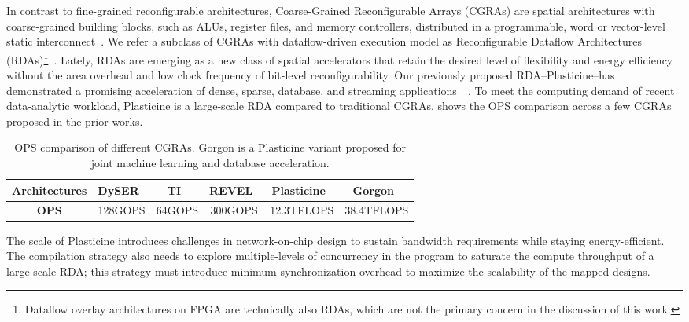 In contrast to fine-grained reconfigurable architectures,
Coarse-Grained Reconfigurable Arrays (CGRAs) are spatial architectures with 
coarse-grained building blocks, such as ALUs, register files, and memory controllers, 
distributed in a programmable, word or vector-level static interconnect~\cite{adres, kress, dyser, piperench, tartan, 
hrl, hycube}.
We refer a subclass of CGRAs with dataflow-driven execution model as Reconfigurable Dataflow
Architectures (RDAs)\footnote{Dataflow overlay architectures on FPGA are technically also RDAs, which are not the primary concern in the discussion of this work.}~\cite{plasticine, ti, streamdataflow,neuflow,cnndataflow,dataflowarch}.
Lately, RDAs are emerging as a new class of spatial accelerators that retain the desired level of
flexibility and energy efficiency without the area overhead and low clock frequency of bit-level reconfigurability.
Our previously proposed RDA--Plasticine--has demonstrated a promising acceleration of dense, sparse, database, and streaming applications~~\cite{plasticine, gorgon, multijoin,prabhakarthesis}.
To meet the computing demand of recent data-analytic workload, Plasticine is a large-scale RDA
compared to traditional CGRAs. 
 shows the OPS comparison across a few CGRAs proposed in the prior works.

\begin{table}
  \centering
\begin{tabular*}{0.88\textwidth}{cccccc}
  \toprule
  \textbf{Architectures} & DySER~\cite{dyser} & TI~\cite{ti} & REVEL~\cite{revel}
  & Plasticine~\cite{plasticine} & Gorgon~\cite{gorgon}\\\midrule
  \textbf{OPS} & 128GOPS & 64GOPS & 300GOPS & 12.3TFLOPS & 38.4TFLOPS \\
  \bottomrule
\end{tabular*}
\caption[OPS comparison of different CGRAs]{OPS comparison of different CGRAs. Gorgon is a
Plasticine variant proposed for joint machine learning and database acceleration.}
\label{tab:ops}
\end{table}

The scale of Plasticine introduces challenges in network-on-chip design to sustain 
bandwidth requirements while staying energy-efficient.
The compilation strategy also needs to explore multiple-levels of
concurrency in the program to saturate the compute throughput of a large-scale RDA;
this strategy must introduce minimum synchronization overhead to maximize the scalability of the
mapped designs.

